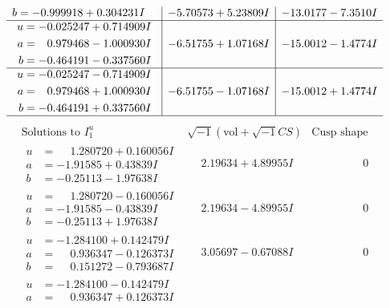\documentclass[1p]{elsarticle_modified}
\theoremstyle{definition}
\newcommand{\I}{\sqrt{-1}}
\begin{document}
$$\begin{array}{c|c|c}
\begin{aligned}
b &= -0.999918 + 0.304231 I\end{aligned}
 & -5.70573 + 5.23809 I & -13.0177 - 7.3510 I \\ \hline\begin{aligned}
u &= -0.025247 + 0.714909 I \\
a &= \phantom{-}0.979468 - 1.000930 I \\
b &= -0.464191 - 0.337560 I\end{aligned}
 & -6.51755 + 1.07168 I & -15.0012 - 1.4774 I \\ \hline\begin{aligned}
u &= -0.025247 - 0.714909 I \\
a &= \phantom{-}0.979468 + 1.000930 I \\
b &= -0.464191 + 0.337560 I\end{aligned}
 & -6.51755 - 1.07168 I & -15.0012 + 1.4774 I\\
 \hline 
 \end{array}$$\newpage$$\begin{array}{c|c|c}  
\text{Solutions to }I^u_{1}& \I (\text{vol} + \sqrt{-1}CS) & \text{Cusp shape}\\
 \hline 
\begin{aligned}
u &= \phantom{-}1.280720 + 0.160056 I \\
a &= -1.91585 + 0.43839 I \\
b &= -0.25113 - 1.97638 I\end{aligned}
 & \phantom{-}2.19634 + 4.89955 I & \phantom{-0.000000 } 0 \\ \hline\begin{aligned}
u &= \phantom{-}1.280720 - 0.160056 I \\
a &= -1.91585 - 0.43839 I \\
b &= -0.25113 + 1.97638 I\end{aligned}
 & \phantom{-}2.19634 - 4.89955 I & \phantom{-0.000000 } 0 \\ \hline\begin{aligned}
u &= -1.284100 + 0.142479 I \\
a &= \phantom{-}0.936347 - 0.126373 I \\
b &= \phantom{-}0.151272 - 0.793687 I\end{aligned}
 & \phantom{-}3.05697 - 0.67088 I & \phantom{-0.000000 } 0 \\ \hline\begin{aligned}
u &= -1.284100 - 0.142479 I \\
a &= \phantom{-}0.936347 + 0.126373 I \\

\end{aligned}
\end{array}$$
\end{document}
